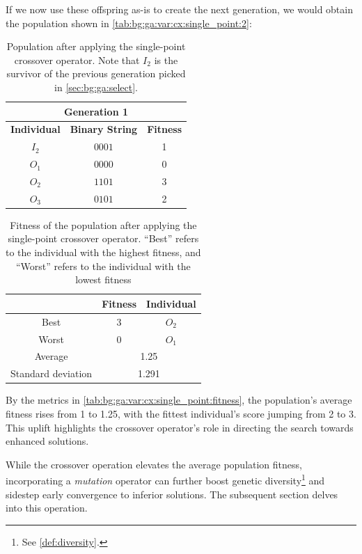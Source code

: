   If we now use these offspring as-is to create the next generation, we would 
  obtain the population shown in 
  \vref{tab:bg:ga:var:cx:single_point:2}:

  \begin{table}[ht!]
    \centering
    \begin{tabular}{c | c | c }
      \multicolumn{3}{c}{\textbf{Generation 1}} \\
      \hline
      \hline
      \textbf{Individual} & \textbf{Binary String}  & \textbf{Fitness} \\
      \hline
      \(I_2\)             & \(0001\)                & 1 \\
      \(O_1\)             & \(0000\)                & 0 \\
      \(O_2\)             & \(1101\)                & 3 \\
      \(O_3\)             & \(0101\)                & 2
    \end{tabular}
    \caption{
      Population after applying the single-point crossover operator.
      Note that \(I_2\) is the survivor of the previous generation picked in 
      \vref{sec:bg:ga:select}.
    }
    \label{tab:bg:ga:var:cx:single_point:2}
  \end{table}

  \begin{table}[H]
    \centering
    \begin{tabular}{|c|c|c|}
      \hline
            & \textbf{Fitness} & \textbf{Individual}  \\
      \hline
      Best  & 3 & \(O_2\) \\
      Worst & 0 & \(O_1\) \\
      \hline
      \hline
      Average & \multicolumn{2}{c|}{1.25} \\
      \hline
      Standard deviation & \multicolumn{2}{c|}{1.291} \\
      \hline
    \end{tabular}
    \caption{
      Fitness of the population after applying the single-point crossover 
      operator.
      \enquote{Best} refers to the individual with the highest fitness, and 
      \enquote{Worst} refers to the individual with the lowest fitness
    }
    \label{tab:bg:ga:var:cx:single_point:fitness}
  \end{table}

  By the metrics in \vref{tab:bg:ga:var:cx:single_point:fitness}, the 
  population's average fitness rises from 1 to 1.25, with the fittest 
  individual's score jumping from 2 to 3.
  This uplift highlights the crossover operator's role in directing the search 
  towards enhanced solutions.

  While the crossover operation elevates the average population fitness, 
  incorporating a \emph{mutation} operator can further boost genetic 
  diversity\footnote{See \vref{def:diversity}.} and sidestep early convergence
  to inferior solutions.
  The subsequent section delves into this operation.
